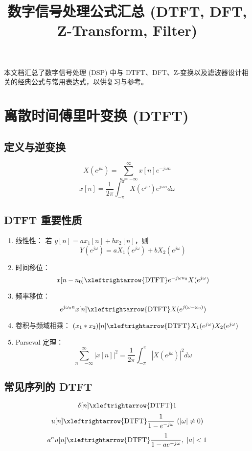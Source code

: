 \documentclass[12pt,a4paper]{article}
\title{数字信号处理公式汇总 (DTFT, DFT, Z-Transform, Filter)}
\author{}
\date{}
\begin{document}
\begin{CJK}{UTF8}{gbsn}
\maketitle
\onehalfspacing

本文档汇总了数字信号处理 (DSP) 中与 DTFT、DFT、Z-变换以及滤波器设计相关的经典公式与常用表达式，以供复习与参考。

\section{离散时间傅里叶变换 (DTFT)}

\subsection{定义与逆变换}
\[
X(e^{j\omega}) = \sum_{n=-\infty}^{\infty} x[n] e^{-j \omega n}
\]
\[
x[n] = \frac{1}{2\pi}\int_{-\pi}^{\pi} X(e^{j\omega}) e^{j\omega n} d\omega
\]

\subsection{DTFT 重要性质}
\begin{enumerate}
\item 线性性：  
若 \(y[n] = a x_1[n] + b x_2[n]\)，则  
\[
Y(e^{j\omega}) = a X_1(e^{j\omega}) + b X_2(e^{j\omega})
\]

\item 时间移位：  
\[
x[n-n_0] \xleftrightarrow{\text{DTFT}} e^{-j\omega n_0} X(e^{j\omega})
\]

\item 频率移位：  
\[
e^{j\omega_0 n}x[n] \xleftrightarrow{\text{DTFT}} X(e^{j(\omega-\omega_0)})
\]

\item 卷积与频域相乘：  
\((x_1 * x_2)[n] \xleftrightarrow{\text{DTFT}} X_1(e^{j\omega})X_2(e^{j\omega})\)

\item Parseval 定理：  
\[
\sum_{n=-\infty}^{\infty} |x[n]|^2 = \frac{1}{2\pi}\int_{-\pi}^{\pi} |X(e^{j\omega})|^2 d\omega
\]
\end{enumerate}

\subsection{常见序列的 DTFT}
\[
\delta[n] \xleftrightarrow{\text{DTFT}} 1
\]
\[
u[n] \xleftrightarrow{\text{DTFT}} \frac{1}{1 - e^{-j\omega}} \ (|\omega|\neq 0)
\]
\[
a^n u[n] \xleftrightarrow{\text{DTFT}} \frac{1}{1 - a e^{-j\omega}},\ |a|<1
\]


\end{CJK}
\end{document}
